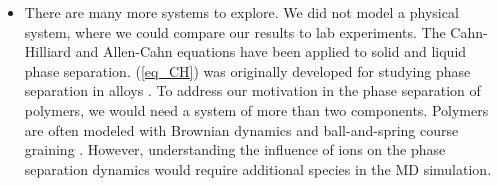 \documentclass[12pt, reqno]{report}
\theoremstyle{definition}
\theoremstyle{remark}
\begin{document}
\begin{itemize}
\item There are many more systems to explore.
We did not model a physical system, where we could compare our results to lab experiments.
The Cahn-Hilliard and Allen-Cahn equations have been applied to solid and liquid phase separation.
(\ref{eq_CH}) was originally developed for studying phase separation in alloys \cite{cahn_1958_free}.
To address our motivation in the phase separation of polymers, we would need a system of more than two components. 
Polymers are often modeled with Brownian dynamics and ball-and-spring course graining \cite{larson_1997_hydrodynamics}.
However, understanding the influence of ions on the phase separation dynamics would require additional species in the MD simulation.

\end{itemize}


    


\end{document}
